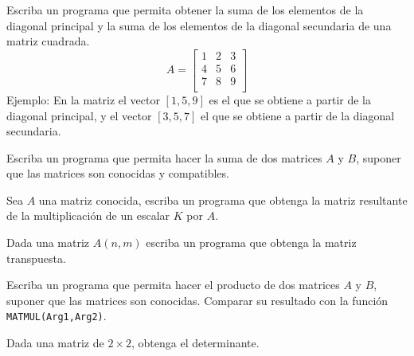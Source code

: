 \documentclass[11pt]{exam}
\begin{document}
\begin{questions}
\item 
Escriba un programa que permita obtener la suma de los elementos de la diagonal principal y la suma de los elementos de la diagonal secundaria de una matriz cuadrada. 
\begin{equation}
A=\begin{bmatrix}
 1&2&3\\
4&5&6\\
7&8&9\\
\end{bmatrix}
\end{equation}
Ejemplo: En la matriz el vector $[1, 5, 9]$ es el que se obtiene a partir de la diagonal principal, y el vector $[3, 5, 7]$ el que se obtiene a partir de la diagonal secundaria. 

\item 
Escriba un programa  que permita hacer la suma de dos matrices $A$ y $B$, suponer que las matrices son conocidas y compatibles.
\item 
Sea $A$ una matriz conocida, escriba un programa que obtenga la matriz resultante de la multiplicaci\'on de un escalar $K$ por $A$.
\item 
Dada una matriz $A(n,m)$ escriba un programa que obtenga la matriz transpuesta.
\item 
Escriba un programa  que permita hacer el producto de dos matrices $A$ y $B$, suponer que las matrices son conocidas. Comparar su resultado con la funci\'on \texttt{MATMUL(Arg1,Arg2)}.
\item 
Dada una matriz de $2\times 2$, obtenga el determinante.


\end{questions}
%
\end{document}

